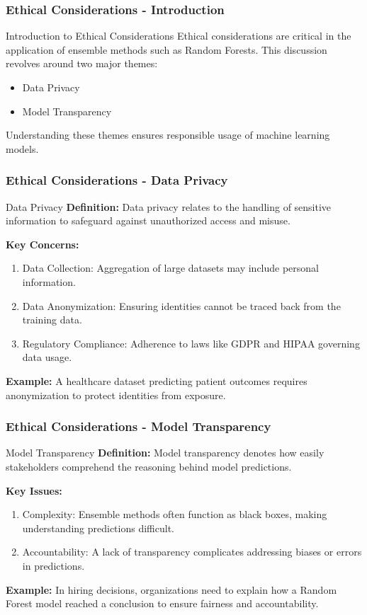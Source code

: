 \documentclass[aspectratio=169]{beamer}
\begin{document}
\begin{frame}[fragile]
    \frametitle{Ethical Considerations - Introduction}
    \begin{block}{Introduction to Ethical Considerations}
        Ethical considerations are critical in the application of ensemble methods such as Random Forests.
        This discussion revolves around two major themes: 
        \begin{itemize}
            \item Data Privacy
            \item Model Transparency
        \end{itemize}
        Understanding these themes ensures responsible usage of machine learning models.
    \end{block}
\end{frame}

\begin{frame}[fragile]
    \frametitle{Ethical Considerations - Data Privacy}
    \begin{block}{Data Privacy}
        \textbf{Definition:} Data privacy relates to the handling of sensitive information to safeguard against unauthorized access and misuse.

        \textbf{Key Concerns:}
        \begin{enumerate}
            \item Data Collection: Aggregation of large datasets may include personal information.
            \item Data Anonymization: Ensuring identities cannot be traced back from the training data.
            \item Regulatory Compliance: Adherence to laws like GDPR and HIPAA governing data usage.
        \end{enumerate}

        \textbf{Example:} A healthcare dataset predicting patient outcomes requires anonymization to protect identities from exposure.
    \end{block}
\end{frame}

\begin{frame}[fragile]
    \frametitle{Ethical Considerations - Model Transparency}
    \begin{block}{Model Transparency}
        \textbf{Definition:} Model transparency denotes how easily stakeholders comprehend the reasoning behind model predictions.

        \textbf{Key Issues:}
        \begin{enumerate}
            \item Complexity: Ensemble methods often function as black boxes, making understanding predictions difficult.
            \item Accountability: A lack of transparency complicates addressing biases or errors in predictions.
        \end{enumerate}

        \textbf{Example:} In hiring decisions, organizations need to explain how a Random Forest model reached a conclusion to ensure fairness and accountability.
    \end{block}
\end{frame}
\end{document}
